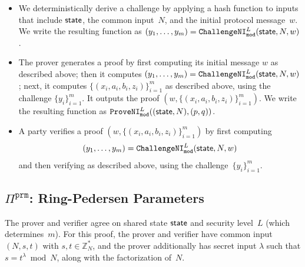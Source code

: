 \documentclass[11pt]{article}
\def\state{{\sf state}}
\newcommand{\proof}[1]{\ensuremath{\Pi^{\mathtt{#1}}}}
\newcommand{\challengeni}[1]{\ensuremath{\mathtt{ChallengeNI}_{\mathtt{#1}}}}
\newcommand{\proveni}[1]{\ensuremath{\mathtt{ProveNI}_{\mathtt{#1}}}}
\newcommand{\?}[1]{\stackrel{?}{#1}}
\begin{document}
\begin{itemize}
  \item We deterministically derive a challenge by applying a hash function to inputs that include $\state$, the common input~$N$, and the initial protocol message~$w$.   
  We write the resulting function as $(y_1, \ldots, y_m)=\challengeni{mod}^L(\state, N, w)$.

  \item The prover generates a proof by first computing its initial message $w$ as described above; then it computes 
        $(y_1, \ldots, y_m) = \challengeni{mod}^L(\state, N, w)$; next, it computes $\{(x_i, a_i, b_i, z_i)\}_{i=1}^m$ as described above, using the challenge $\{y_i\}_{i=1}^m$. It outputs the proof $(w, \{(x_i, a_i, b_i, z_i)\}_{i=1}^m)$. We write the resulting function as $\proveni{mod}^L((\state, N), (p, q))$.

  \item A party verifies a proof  $(w, \{(x_i, a_i, b_i, z_i)\}_{i=1}^m)$ by first computing \[(y_1, \ldots, y_m) = \challengeni{mod}^L(\state, N, w)\] and then verifying as described above, using the challenge~$\{y_i\}_{i=1}^m$.
\end{itemize}

\subsection{$\proof{prm}$: Ring-Pedersen Parameters}
The prover and verifier agree on shared state $\state$ and security level~$L$ (which determines~$m$). 
For this proof, the prover and verifier have common input $(N, s, t)$ with $s, t \in {\mathbb Z}_N^*$, and the prover additionally has secret input $\lambda$ such that $s=t^\lambda \bmod N$, along with the factorization of~$N$.
\end{document}
